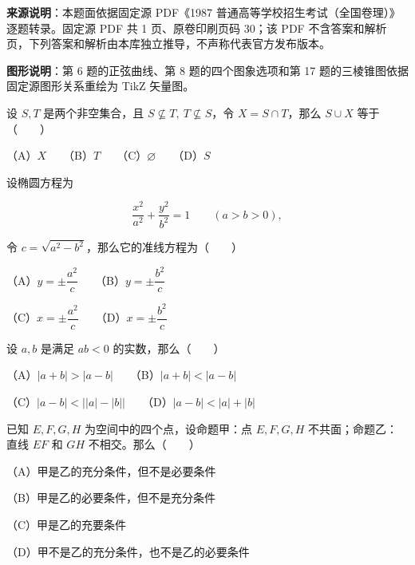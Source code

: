 


\begin{gktip}
\textbf{来源说明}：本题面依据固定源 PDF《1987 普通高等学校招生考试（全国卷理）》逐题转录。固定源 PDF 共 1 页、原卷印刷页码 30；该 PDF 不含答案和解析页，下列答案和解析由本库独立推导，不声称代表官方发布版本。

\textbf{图形说明}：第 6 题的正弦曲线、第 8 题的四个图象选项和第 17 题的三棱锥图依据固定源图形关系重绘为 TikZ 矢量图。
\end{gktip}

\begin{question}
设 $S,T$ 是两个非空集合，且 $S\nsubseteq T,\ T\nsubseteq S$，令 $X=S\cap T$，那么 $S\cup X$ 等于\mbox{（　　）}

（A）$X$　　（B）$T$　　（C）$\varnothing$　　（D）$S$

\end{question}
\begin{question}
设椭圆方程为

\nopagebreak[4]
\[
\frac{x^2}{a^2}+\frac{y^2}{b^2}=1\qquad(a>b>0),
\]

令 $c=\sqrt{a^2-b^2}$，那么它的准线方程为\mbox{（　　）}

（A）$y=\pm\dfrac{a^2}{c}$　　（B）$y=\pm\dfrac{b^2}{c}$

（C）$x=\pm\dfrac{a^2}{c}$　　（D）$x=\pm\dfrac{b^2}{c}$

\end{question}
\begin{question}
设 $a,b$ 是满足 $ab<0$ 的实数，那么\mbox{（　　）}

（A）$|a+b|>|a-b|$　　（B）$|a+b|<|a-b|$

（C）$|a-b|<\bigl||a|-|b|\bigr|$　　（D）$|a-b|<|a|+|b|$

\end{question}
\begin{question}
已知 $E,F,G,H$ 为空间中的四个点，设命题甲：点 $E,F,G,H$ 不共面；命题乙：直线 $EF$ 和 $GH$ 不相交。那么\mbox{（　　）}

（A）甲是乙的充分条件，但不是必要条件

（B）甲是乙的必要条件，但不是充分条件

（C）甲是乙的充要条件

（D）甲不是乙的充分条件，也不是乙的必要条件

\end{question}
